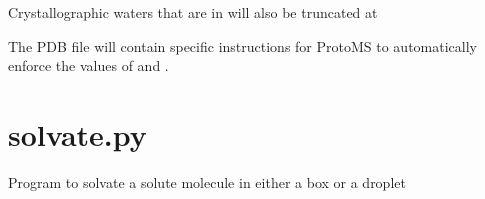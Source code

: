 \documentclass[letterpaper,10pt,english]{sphinxmanual}
\begin{document}
Crystallographic waters that are in  will also be truncated at 

The PDB file will contain specific instructions for ProtoMS to automatically enforce the values of   and .


\section{solvate.py}
\label{\detokenize{tools:solvate-py}}

Program to solvate a solute molecule in either a box or a droplet


%
\begin{sphinxVerbatim}[commandchars=\\\{\}]
  \PYG{p}{[}\PYG{p}{]} \PYG{p}{[} \PYG{p}{]} \PYG{p}{[} \PYG{p}{]} \PYG{p}{[} \PYG{p}{]} \PYG{p}{[} \PYG{p}{]}
                  \PYG{p}{[} \PYG{p}{]} \PYG{p}{[} \PYG{p}{]} \PYG{p}{[} \PYG{p}{]}
                  \PYG{p}{[} \PYG{p}{]} \PYG{p}{[} \PYG{p}{]} \PYG{p}{[} \PYG{p}{]}
                  \PYG{p}{[} \PYG{p}{]}
\end{sphinxVerbatim}
\end{document}

